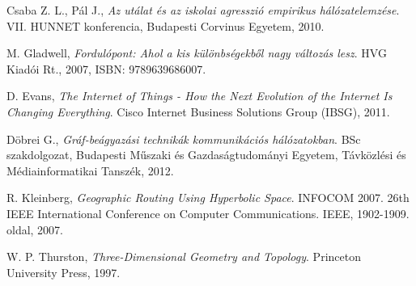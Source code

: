 \begin{thebibliography}{9}
%
%

 Csaba Z. L., Pál J., \emph {Az utálat és az iskolai agresszió empirikus hálózatelemzése}.
VII. HUNNET konferencia, Budapesti Corvinus Egyetem, 2010.

 M. Gladwell, \emph {Fordulópont: Ahol a kis különbségekből nagy változás lesz}.
HVG Kiadói Rt., 2007, ISBN: 9789639686007.

%
%
 D. Evans, \emph {The Internet of Things - How the Next Evolution of the Internet Is Changing Everything}.
Cisco Internet Business Solutions Group (IBSG), 2011.

 Döbrei G., \emph {Gráf-beágyazási technikák kommunikációs hálózatokban}.
BSc szakdolgozat, Budapesti Műszaki és Gazdaságtudományi Egyetem, Távközlési és Médiainformatikai Tanszék, 2012.

 R. Kleinberg, \emph {Geographic Routing Using Hyperbolic Space}.
INFOCOM 2007. 26th IEEE International Conference on Computer Communications. IEEE, 1902-1909. oldal, 2007.

 W. P. Thurston, \emph {Three-Dimensional Geometry and Topology}.
Princeton University Press, 1997.

\end{thebibliography}